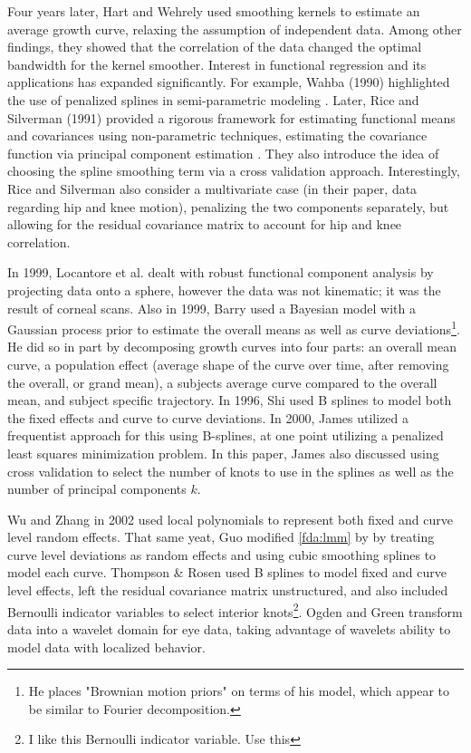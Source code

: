 Four years later, Hart and Wehrely used smoothing kernels to estimate an average growth curve, relaxing the assumption of independent data\cite{hart_kernel_1986}.  
Among other findings, they showed that the correlation of the data changed the optimal bandwidth for the kernel smoother.  
Interest in functional regression and its applications has expanded significantly. 
For example, Wahba (1990) highlighted the use of penalized splines in semi-parametric modeling \cite{wahba_spline_1990}. 
Later, Rice and Silverman (1991) provided a rigorous framework for estimating functional means and covariances using non-parametric techniques, estimating the covariance function via principal component estimation \cite{rice_estimating_1991}.  
They also introduce the idea of choosing the spline smoothing term via a cross validation approach.  
Interestingly, Rice and Silverman also consider a multivariate case (in their paper, data regarding hip and knee motion), penalizing the two components separately, but allowing for the residual covariance matrix to account for hip and knee correlation.

In 1999, Locantore et al. dealt with robust functional component analysis by projecting data onto a sphere, however the data was not kinematic; it was the result of corneal scans\cite{locantore_robust_1999}.  
Also in 1999, Barry used a Bayesian model with a Gaussian process prior to estimate the overall means as well as curve deviations\footnote{He places "Brownian motion priors" on terms of his model, which appear to be similar to Fourier decomposition.}\cite{barry_bayesian_1995}.  
He did so in part by decomposing growth curves into four parts: an overall mean curve, a population effect (average shape of the curve over time, after removing the overall, or grand mean), a subjects average curve compared to the overall mean, and subject specific trajectory.  In 1996, Shi used B splines to model both the fixed effects and curve to curve deviations\cite{shi_analysis_1996}.  
In 2000, James utilized a frequentist approach for this using B-splines, at one point utilizing a penalized least squares minimization problem\cite{james_principal_2000}.  
In this paper, James also discussed using cross validation to select the number of knots to use in the splines as well as the number of principal components \(k\). 

Wu and Zhang in 2002 used local polynomials to represent both fixed and curve level random effects\cite{wu_local_2002}.  
That same yeat, Guo modified \ref{fda:lmm} by by treating curve level deviations as random effects and using cubic smoothing splines to model each curve\cite{guo_functional_2002}.  
Thompson \& Rosen used B splines to model fixed and curve level effects, left the residual covariance matrix unstructured, and also included Bernoulli indicator variables to select interior knots\cite{thompson_bayesian_2008}\footnote{I like this Bernoulli indicator variable.  Use this}.  
Ogden and Green transform data into a wavelet domain for eye data, taking advantage of wavelets ability to model data with localized behavior\cite{ogden_wavelet_2010}. 